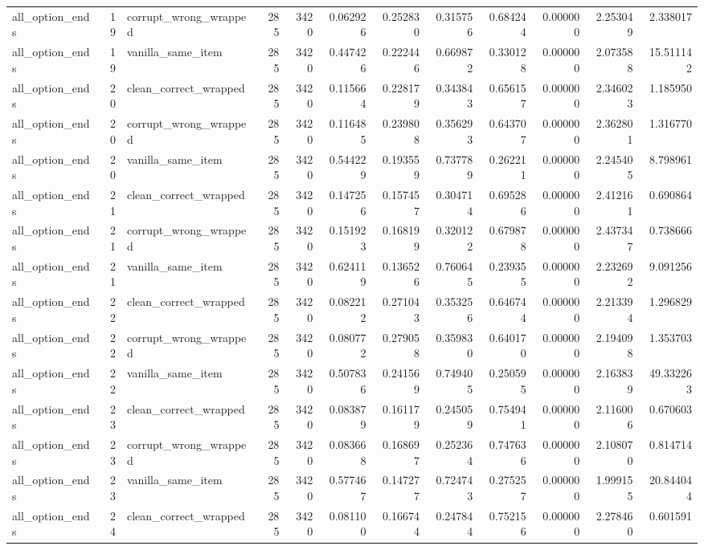 \begin{tabular}{lrlrrrrrrrrr}
all\_option\_ends & 19 & corrupt\_wrong\_wrapped & 285 & 3420 & 0.062926 & 0.252830 & 0.315756 & 0.684244 & 0.000000 & 2.253049 & 2.338017 \\
all\_option\_ends & 19 & vanilla\_same\_item & 285 & 3420 & 0.447426 & 0.222446 & 0.669872 & 0.330128 & 0.000000 & 2.073588 & 15.511142 \\
all\_option\_ends & 20 & clean\_correct\_wrapped & 285 & 3420 & 0.115664 & 0.228179 & 0.343843 & 0.656157 & 0.000000 & 2.346023 & 1.185950 \\
all\_option\_ends & 20 & corrupt\_wrong\_wrapped & 285 & 3420 & 0.116485 & 0.239808 & 0.356293 & 0.643707 & 0.000000 & 2.362801 & 1.316770 \\
all\_option\_ends & 20 & vanilla\_same\_item & 285 & 3420 & 0.544229 & 0.193559 & 0.737789 & 0.262211 & 0.000000 & 2.245405 & 8.798961 \\
all\_option\_ends & 21 & clean\_correct\_wrapped & 285 & 3420 & 0.147256 & 0.157457 & 0.304714 & 0.695286 & 0.000000 & 2.412161 & 0.690864 \\
all\_option\_ends & 21 & corrupt\_wrong\_wrapped & 285 & 3420 & 0.151923 & 0.168199 & 0.320122 & 0.679878 & 0.000000 & 2.437347 & 0.738666 \\
all\_option\_ends & 21 & vanilla\_same\_item & 285 & 3420 & 0.624119 & 0.136526 & 0.760645 & 0.239355 & 0.000000 & 2.232692 & 9.091256 \\
all\_option\_ends & 22 & clean\_correct\_wrapped & 285 & 3420 & 0.082212 & 0.271043 & 0.353256 & 0.646744 & 0.000000 & 2.213394 & 1.296829 \\
all\_option\_ends & 22 & corrupt\_wrong\_wrapped & 285 & 3420 & 0.080772 & 0.279058 & 0.359830 & 0.640170 & 0.000000 & 2.194098 & 1.353703 \\
all\_option\_ends & 22 & vanilla\_same\_item & 285 & 3420 & 0.507836 & 0.241569 & 0.749405 & 0.250595 & 0.000000 & 2.163839 & 49.332263 \\
all\_option\_ends & 23 & clean\_correct\_wrapped & 285 & 3420 & 0.083879 & 0.161179 & 0.245059 & 0.754941 & 0.000000 & 2.116006 & 0.670603 \\
all\_option\_ends & 23 & corrupt\_wrong\_wrapped & 285 & 3420 & 0.083668 & 0.168697 & 0.252364 & 0.747636 & 0.000000 & 2.108070 & 0.814714 \\
all\_option\_ends & 23 & vanilla\_same\_item & 285 & 3420 & 0.577467 & 0.147277 & 0.724743 & 0.275257 & 0.000000 & 1.999155 & 20.844044 \\
all\_option\_ends & 24 & clean\_correct\_wrapped & 285 & 3420 & 0.081100 & 0.166744 & 0.247844 & 0.752156 & 0.000000 & 2.278460 & 0.601591 \\

\end{tabular}
